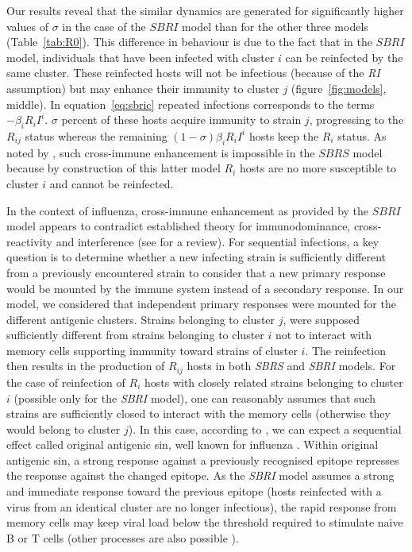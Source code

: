 Our results reveal that the similar dynamics are generated for
significantly higher values of $\sigma$ in the case of the $SBRI$
model than for the other three models (Table~\ref{tab:R0}). This
difference in behaviour is due to the fact that in the $SBRI$ model,
individuals that have been infected with cluster $i$ can be reinfected
by the same cluster. These reinfected hosts will not be infectious
(because of the \textit{RI} assumption) but may enhance their immunity
to cluster $j$ (figure~\ref{fig:models}, middle).
In equation~\eqref{eq:sbric} repeated infections corresponds to the
terms $- \beta_i R_i I^i$. $\sigma$ percent of these hosts acquire
immunity to strain $j$, progressing to the $R_{ij}$ status whereas the
remaining $(1- \sigma) \beta_i R_i I^i$ hosts keep the $R_i$ status.
As noted by \citet{Kryazhimskiy2007}, such cross-immune enhancement is
impossible in the $SBRS$ model because by construction of this latter
model $R_i$ hosts are no more susceptible to cluster $i$ and cannot be
reinfected.

In the context of influenza, cross-immune enhancement as provided by
the $SBRI$ model appears to contradict established theory for
immunodominance, cross-reactivity and interference (see
\citet{Frank2002} for a review).
%
For sequential infections, a key question is to determine whether a
new infecting strain is sufficiently different from a previously
encountered strain to consider that a new primary response would be
mounted by the immune system instead of a secondary response.
%
In our model, we considered that independent primary responses were
mounted for the different antigenic clusters. Strains belonging to
cluster $j$, were supposed sufficiently different from strains
belonging to cluster $i$ not to interact with memory cells supporting
immunity toward strains of cluster $i$. The reinfection then results
in the production of $R_{ij}$ hosts in both \textit{SBRS} and
\textit{SBRI} models.
%
For the case of reinfection of $R_i$ hosts with closely related
strains belonging to cluster $i$ (possible only for the \textit{SBRI}
model), one can reasonably assumes that such strains are sufficiently
closed to interact with the memory cells (otherwise they would belong
to cluster $j$). In this case, according to \citet{Frank2002}, we can
expect a sequential effect called original antigenic sin, well known
for influenza \citet{Francis1953, St1966, Janeway1999}. Within original
antigenic sin, a strong response against a previously recognised
epitope represses the response against the changed epitope. As the
\textit{SBRI} model assumes a strong and immediate response toward the
previous epitope (hosts reinfected with a virus from an identical
cluster are no longer infectious), the rapid response from memory
cells may keep viral load below the threshold required to stimulate
naive B or T cells (other processes are also possible \citep{Janeway1999}).

